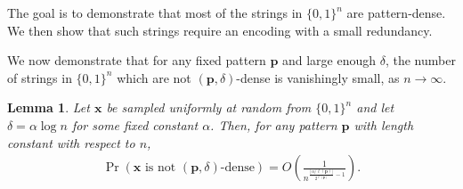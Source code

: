\documentclass[onecolumn]{IEEEtran}
\newtheorem{lemma}{Lemma}
\newtheorem{theorem}{Theorem}
\newcommand{\bl}{n}
\newcommand{\numedits}{t}
\newcommand{\editsize}{k}
\newcommand{\length}[1]{{\ell}(#1)}
\newcommand{\encode}{\mathsf{Enc}}
\newcommand{\code}{\mathscr{C}}
\newcommand{\rep}[2]{\mathsf{Rep}_{#1}(#2)}
\newcommand{\bfp}{{\mathbf{ p}}}
\newcommand{\bfx}{{\mathbf{ x}}}
\begin{document}
The goal is to demonstrate that most of the strings in $\{0,1\}^\bl$ are pattern-dense. We then show that such strings require an encoding with a small redundancy. 


    
   


We now demonstrate that for any fixed pattern $\bfp$ and large enough $\delta$, the number of strings in $\{0,1\}^\bl$ which are not $(\mathbf{p}, \delta)$-dense is vanishingly small, as $\bl \to \infty$.
\begin{lemma}
\label{lem:pattern enrichment}
Let $\bfx$ be sampled uniformly at random from $\{0,1\}^\bl$ and let $\delta = \alpha \log \bl$ for some fixed constant $\alpha$. Then, for any pattern $\bfp$ with length constant with respect to $\bl$,
\begin{align*}
    \Pr(\mathbf{x} \text{ is not } (\mathbf{p}, \delta)\text{-dense}) = O\left(\frac{1}{n^{\frac{\lfloor\alpha/\length{\mathbf{p}}\rfloor}{2^{\length{\mathbf{p}}}}-1}}\right).
\end{align*}
\end{lemma}
\end{document}
